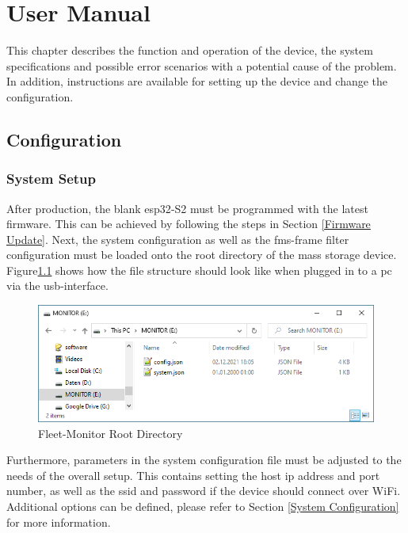 \chapter{User Manual}
This chapter describes the function and operation of the device, the system specifications and possible error scenarios with a potential cause of the problem. In addition, instructions are available for setting up the device and change the configuration.

\section{Configuration}
\subsection{System Setup}
After production, the blank \gls{esp32}-S2 must be programmed with the latest firmware. This can be achieved by following the steps in Section \ref{Firmware Update}. Next, the system configuration as well as the \acrshort{fms}-frame filter configuration must be loaded onto the root directory of the mass storage device. Figure\;\ref{fig:fleet-monitor-root-directory} shows how the file structure should look like when plugged in to a \acrshort{pc} via the \acrshort{usb}-interface.

\medskip
\begin{figure}[h!]
	\centering
	\includegraphics[width=13cm]{images/File_Explorer}
	\caption{Fleet-Monitor Root Directory}
	\label{fig:fleet-monitor-root-directory}
\end{figure}

Furthermore, parameters in the system configuration file must be adjusted to the needs of the overall setup. This contains setting the host \acrshort{ip} address and port number, as well as the \acrshort{ssid} and password if the device should connect over WiFi. Additional options can be defined, please refer to Section \ref{System Configuration} for more information.
\newpage

